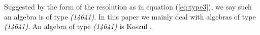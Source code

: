 \documentclass{amsart}
\begin{document}
Suggested by the form of the resolution as in equation (\ref{eq:type3}), we say such an algebra is of type \textit{(14641)}. In this paper we mainly deal with algebras of type \textit{(14641)}. An algebra of type \textit{(14641)} is Koszul \cite[Theorem 0.1]{MR2529094}.
\end{document}
